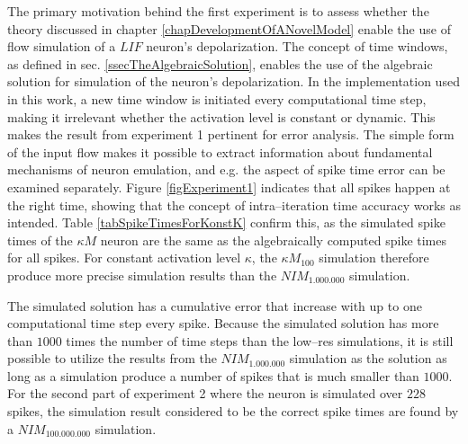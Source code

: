 		The primary motivation behind the first experiment is to assess whether the theory discussed in chapter \ref{chapDevelopmentOfANovelModel} enable the use of flow simulation of a $LIF$ neuron's depolarization.
		The concept of time windows, as defined in sec. \ref{ssecTheAlgebraicSolution}, enables the use of the algebraic solution for simulation of the neuron's depolarization. 
		In the implementation used in this work, a new time window is initiated every computational time step, making it irrelevant whether the activation level is constant or dynamic. 
		This makes the result from experiment 1 pertinent for error analysis. 
		The simple form of the input flow makes it possible to extract information about fundamental mechanisms of neuron emulation,
			and e.g. the aspect of spike time error can be examined separately. %
		Figure \ref{figExperiment1} indicates that all spikes happen at the right time, showing that the concept of intra--iteration time accuracy works as intended.
		Table \ref{tabSpikeTimesForKonstK} confirm this, as the simulated spike times of the $\kappa M$ neuron are the same as the algebraically computed spike times for all spikes.
		For constant activation level $\kappa$, the $\kappa M_{100}$ simulation therefore produce more precise simulation results than the $NIM_{1.000.000}$ simulation. %

		The simulated solution has a cumulative error that increase with up to one computational time step every spike.
		Because the simulated solution has more than $1000$ times the number of time steps than the low--res simulations, it is still possible to utilize the results from the $NIM_{1.000.000}$ simulation as the solution as long as a simulation produce a number of spikes that is much smaller than $1000$.
		For the second part of experiment 2 where the neuron is simulated over $228$ spikes, 
			the simulation result considered to be the correct spike times are found by a $NIM_{100.000.000}$ simulation.
 
